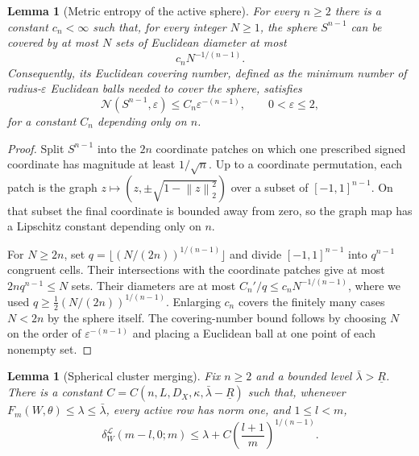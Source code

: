 \documentclass[pdflatex,sn-mathphys-num]{sn-jnl}
\theoremstyle{thmstyleone}
\newtheorem{lemma}[theorem]{Lemma}
\theoremstyle{thmstyletwo}
\theoremstyle{thmstylethree}
\newcommand{\norm}[1]{\left\lVert #1 \right\rVert}
\begin{document}
\begin{lemma}[Metric entropy of the active sphere]\label{lem:sphere-cover}
For every $n\ge2$ there is a constant $c_n<\infty$ such that, for every integer $N\ge1$, the sphere $S^{n-1}$ can be covered by at most $N$ sets of Euclidean diameter at most
\begin{equation}
c_nN^{-1/(n-1)}.
\label{eq:sphere-cover}
\end{equation}
Consequently, its Euclidean covering number, defined as the minimum number of
radius-$\varepsilon$ Euclidean balls needed to cover the sphere, satisfies
\[
\mathcal N(S^{n-1},\varepsilon)
\le C_n\varepsilon^{-(n-1)},
\qquad 0<\varepsilon\le2,
\]
for a constant $C_n$ depending only on $n$.
\end{lemma}

\begin{proof}
Split $S^{n-1}$ into the $2n$ coordinate patches on which one prescribed signed coordinate has magnitude at least $1/\sqrt n$. Up to a coordinate permutation, each patch is the graph
$z\mapsto(z,\pm\sqrt{1-\norm{z}_2^2})$ over a subset of $[-1,1]^{n-1}$. On that subset the final coordinate is bounded away from zero, so the graph map has a Lipschitz constant depending only on $n$.

For $N\ge2n$, set $q=\lfloor(N/(2n))^{1/(n-1)}\rfloor$ and divide $[-1,1]^{n-1}$ into $q^{n-1}$ congruent cells. Their intersections with the coordinate patches give at most $2nq^{n-1}\le N$ sets. Their diameters are at most $C_n'/q\le c_nN^{-1/(n-1)}$, where we used $q\ge\tfrac12(N/(2n))^{1/(n-1)}$. Enlarging $c_n$ covers the finitely many cases $N<2n$ by the sphere itself. The covering-number bound follows by choosing $N$ on the order of $\varepsilon^{-(n-1)}$ and placing a Euclidean ball at one point of each nonempty set.
\end{proof}

\begin{lemma}[Spherical cluster merging]\label{lem:merge}
Fix $n\ge2$ and a bounded level $\bar\lambda>\underline R$. There is a constant $C=C(n,L,D_X,\kappa,\bar\lambda-\underline R)$ such that, whenever $F_m(W,\theta)\le\lambda\le\bar\lambda$, every active row has norm one, and $1\le l<m$,
\begin{equation}
\delta_W^{\mathcal L}(m-l,0;m)
\le
\lambda+C\left(\frac{l+1}{m}\right)^{1/(n-1)}.
\label{eq:merge-bound}
\end{equation}
\end{lemma}
\end{document}
